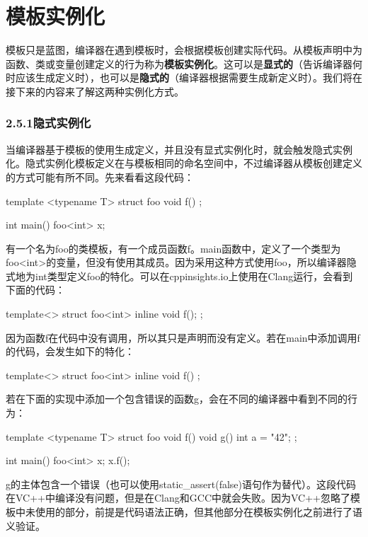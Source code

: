 \section{模板实例化}

模板只是蓝图，编译器在遇到模板时，会根据模板创建实际代码。从模板声明中为函数、类或变量创建定义的行为称为\textbf{模板实例化}。这可以是\textbf{显式的}（告诉编译器何时应该生成定义时），也可以是\textbf{隐式的}（编译器根据需要生成新定义时）。我们将在接下来的内容来了解这两种实例化方式。

\subsubsection{2.5.1\hspace{0.2cm}隐式实例化}

当编译器基于模板的使用生成定义，并且没有显式实例化时，就会触发隐式实例化。隐式实例化模板定义在与模板相同的命名空间中，不过编译器从模板创建定义的方式可能有所不同。先来看看这段代码：

\begin{cpp}
template <typename T>
struct foo
{
	void f() {}
};

int main()
{
	foo<int> x;
}
\end{cpp}

有一个名为foo的类模板，有一个成员函数f。main函数中，定义了一个类型为foo<int>的变量，但没有使用其成员。因为采用这种方式使用foo，所以编译器隐式地为int类型定义foo的特化。可以在cppinsights.io上使用在Clang运行，会看到下面的代码：

\begin{cpp}
template<>
struct foo<int>
{
	inline void f();
};
\end{cpp}

因为函数f在代码中没有调用，所以其只是声明而没有定义。若在main中添加调用f的代码，会发生如下的特化：

\begin{cpp}
template<>
struct foo<int>
{
	inline void f() { }
};
\end{cpp}

若在下面的实现中添加一个包含错误的函数g，会在不同的编译器中看到不同的行为：

\begin{cpp}
template <typename T>
struct foo
{
	void f() {}
	void g() {int a = "42";}
};

int main()
{
	foo<int> x;
	x.f();
}
\end{cpp}

g的主体包含一个错误（也可以使用static\_assert(false)语句作为替代）。这段代码在VC++中编译没有问题，但是在Clang和GCC中就会失败。因为VC++忽略了模板中未使用的部分，前提是代码语法正确，但其他部分在模板实例化之前进行了语义验证。


